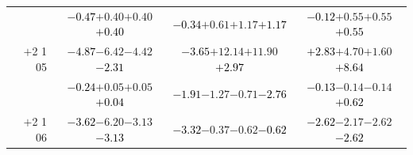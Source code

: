 \documentclass[compress]{beamer}
\begin{document}
\begin{frame}
\begin{tabular}{r | c | c | c}
          & \textcolor{black}{$-0.47$}\hspace{0.1 cm}$+0.40$\hspace{0.1 cm}$+0.40$\hspace{0.1 cm}\textcolor{black}{$+0.40$} & \textcolor{black}{$-0.34$}\hspace{0.1 cm}$+0.61$\hspace{0.1 cm}$+1.17$\hspace{0.1 cm}\textcolor{black}{$+1.17$} & \textcolor{black}{$-0.12$}\hspace{0.1 cm}$+0.55$\hspace{0.1 cm}$+0.55$\hspace{0.1 cm}\textcolor{black}{$+0.55$} \\
$+$2 1 05 & \textcolor{black}{$-4.87$}\hspace{0.1 cm}$-6.42$\hspace{0.1 cm}$-4.42$\hspace{0.1 cm}\textcolor{black}{$-2.31$} & \textcolor{black}{$-3.65$}\hspace{0.1 cm}$+12.14$\hspace{0.1 cm}$+11.90$\hspace{0.1 cm}\textcolor{black}{$+2.97$} & \textcolor{black}{$+2.83$}\hspace{0.1 cm}$+4.70$\hspace{0.1 cm}$+1.60$\hspace{0.1 cm}\textcolor{black}{$+8.64$} \\
          & \textcolor{black}{$-0.24$}\hspace{0.1 cm}$+0.05$\hspace{0.1 cm}$+0.05$\hspace{0.1 cm}\textcolor{black}{$+0.04$} & \textcolor{black}{$-1.91$}\hspace{0.1 cm}$-1.27$\hspace{0.1 cm}$-0.71$\hspace{0.1 cm}\textcolor{black}{$-2.76$} & \textcolor{black}{$-0.13$}\hspace{0.1 cm}$-0.14$\hspace{0.1 cm}$-0.14$\hspace{0.1 cm}\textcolor{black}{$+0.62$} \\
$+$2 1 06 & \textcolor{black}{$-3.62$}\hspace{0.1 cm}$-6.20$\hspace{0.1 cm}$-3.13$\hspace{0.1 cm}\textcolor{black}{$-3.13$} & \textcolor{black}{$-3.32$}\hspace{0.1 cm}$-0.37$\hspace{0.1 cm}$-0.62$\hspace{0.1 cm}\textcolor{black}{$-0.62$} & \textcolor{black}{$-2.62$}\hspace{0.1 cm}$-2.17$\hspace{0.1 cm}$-2.62$\hspace{0.1 cm}\textcolor{black}{$-2.62$} \\

\end{tabular}
\end{frame}
\end{document}
